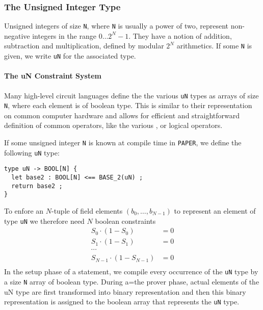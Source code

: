 \subsubsection{The Unsigned Integer Type} Unsigned integers of size \texttt{N}, where \texttt{N} is usually a power of two, represent non-negative integers in the range $0\ldots 2^N-1$. They have a notion of addition, subtraction and multiplication, defined by modular $2^N$ arithmetics. If some \texttt{N} is given, we write \texttt{uN} for the associated type.

\paragraph{The uN Constraint System} Many high-level circuit languages define the the various \texttt{uN} types as arrays of size \texttt{N}, where each element is of boolean type. This is similar to their representation on common computer hardware and allows for efficient and straightforward definition of common operators, like the various , or logical operators.

If some unsigned integer \texttt{N} is known at compile time in \texttt{PAPER}, we define the following \texttt{uN} type:
\begin{lstlisting}
type uN -> BOOL[N] { 
  let base2 : BOOL[N] <== BASE_2(uN) ;
  return base2 ;
}
\end{lstlisting}
To enfore an $N$-tuple of field elements $(b_0,\ldots,b_{N-1})$ to represent an element of type \texttt{uN} we therefore need $N$ boolean constraints 
\begin{align*}
S_0 \cdot (1-S_0) & = 0\\
S_1 \cdot (1-S_1) & = 0\\
\cdots &\\
S_{N-1} \cdot (1-S_{N-1}) & = 0\\
\end{align*}
In the setup phase of a statement, we compile every occurrence of the \texttt{uN} type by a size \texttt{N} array of boolean type. During a=the prover phase, actual elements of the uN type are first transformed into binary representation and then this binary representation is assigned to the boolean array that represents the \texttt{uN} type.

